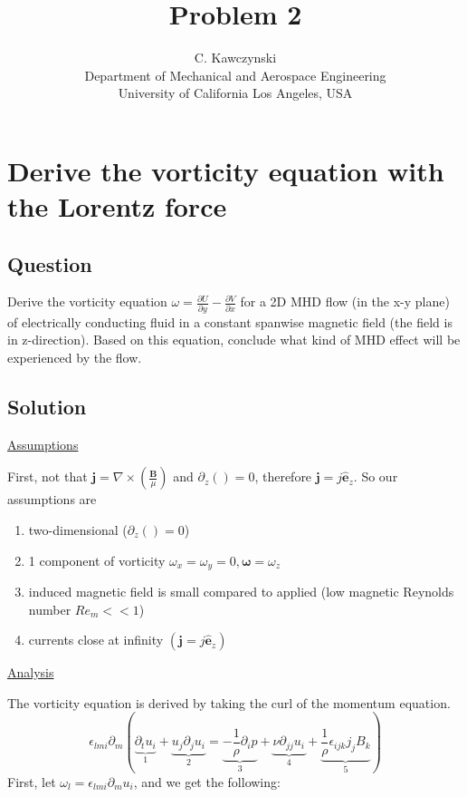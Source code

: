 \documentclass[11pt]{article}
\newcommand{\B}{\mathbf{B}}
\newcommand{\J}{\mathbf{j}}
\newcommand{\PD}{\partial}
\begin{document}
\doublespacing
\title{Problem 2}
\author{C. Kawczynski \\
Department of Mechanical and Aerospace Engineering \\
University of California Los Angeles, USA\\
}
\maketitle

\section{Derive the vorticity equation with the Lorentz force}
\subsection{Question}
Derive the vorticity equation $\omega = \frac{\PD U}{\PD y} - \frac{\PD V}{\PD x}$ for a 2D MHD flow (in the x-y plane) of electrically conducting fluid in a constant spanwise magnetic field (the field is in z-direction). Based on this equation, conclude what kind of MHD effect will be experienced by the flow.

\subsection{Solution}
\underline{Assumptions}

First, not that $\J = \nabla \times \left( \frac{\B}{\mu}\right)$ and $\PD_z () = 0$, therefore $\J = j \mathbf{\hat{e}}_z$. So our assumptions are
\begin{enumerate}
\item two-dimensional ($\PD_z() = 0$)
\item 1 component of vorticity $\omega_x = \omega_y = 0, \mathbf{\omega} = \omega_z$
\item induced magnetic field is small compared to applied (low magnetic Reynolds number $Re_m << 1$)
\item currents close at infinity $(\J = j \mathbf{\hat{e}}_z)$
\end{enumerate}

\underline{Analysis}

The vorticity equation is derived by taking the curl of the momentum equation.
\begin{equation*}
	\epsilon_{lmi} \PD_m
	\left( 
	\underbrace{\PD_t u_i}_{1} +
	\underbrace{u_j \PD_j u_i}_{2} = 
	\underbrace{-\frac{1}{\rho} \PD_i p}_{3} + 
	\underbrace{\nu \PD_{jj} u_i}_{4} + 
	\underbrace{\frac{1}{\rho} \epsilon_{ijk} j_j B_k}_{5}
	\right)
\end{equation*}
First, let $\omega_l = \epsilon_{lmi} \PD_m u_i$, and we get the following:
\end{document}
